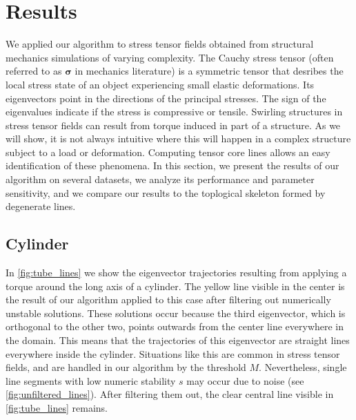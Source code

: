 
%
\section{Results} %
\label{sec:tcl_results}
%
We applied our algorithm to stress tensor fields obtained from structural
mechanics simulations of varying complexity.
%
The Cauchy stress tensor (often referred to as $\mathbf{\sigma}$ in mechanics
literature) is a symmetric tensor that desribes the local stress state of an
object experiencing small elastic deformations.
%
Its eigenvectors point in the directions of the principal stresses.
%
The sign of the eigenvalues indicate if the stress is compressive or tensile.
%
Swirling structures in stress tensor fields can result from torque induced in
part of a structure.
%
As we will show, it is not always intuitive where this will happen in a complex
structure subject to a load or deformation.
%
Computing tensor core lines allows an easy identification of these phenomena.
%
In this section, we present the results of our algorithm on several datasets, we
analyze its performance and parameter sensitivity, and we compare our results to
the toplogical skeleton formed by degenerate lines.
%
\subsection{Cylinder} %
\label{sub:torque_applied_to_a_cylinder}
%
In \autoref{fig:tube_lines} we show the eigenvector trajectories resulting from
applying a torque around the long axis of a cylinder.
%
The yellow line visible in the center is the result of our algorithm applied to
this case after filtering out numerically unstable solutions.
%
These solutions occur because the third eigenvector, which is orthogonal to the
other two, points outwards from the center line everywhere in the domain.
%
This means that the trajectories of this eigenvector are straight lines
everywhere inside the cylinder.
%
Situations like this are common in stress tensor fields, and are handled in our
algorithm by the threshold $M$.
%
Nevertheless, single line segments with low numeric stability $s$ may occur due
to noise (see \autoref{fig:unfiltered_lines}).
%
After filtering them out, the clear central line visible in
\autoref{fig:tube_lines} remains.
%
%
